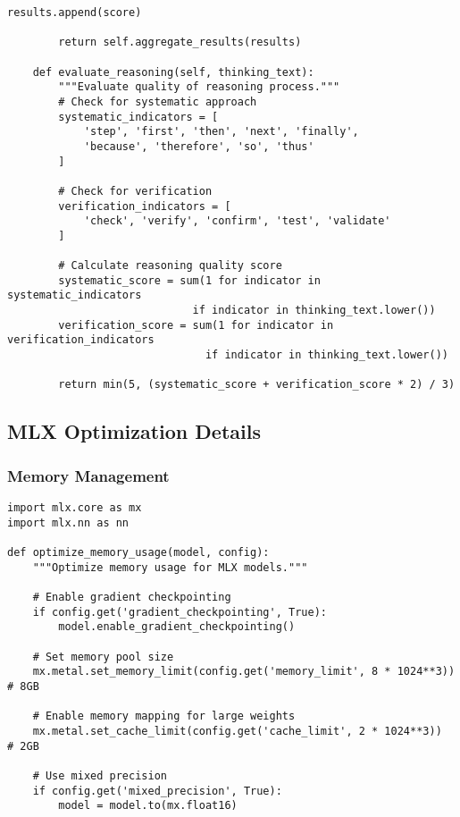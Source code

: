 \begin{table}[H]
\begin{lstlisting}[caption=Evaluation benchmark implementation,label=lst:benchmark-impl]
            results.append(score)
            
        return self.aggregate_results(results)
    
    def evaluate_reasoning(self, thinking_text):
        """Evaluate quality of reasoning process."""
        # Check for systematic approach
        systematic_indicators = [
            'step', 'first', 'then', 'next', 'finally',
            'because', 'therefore', 'so', 'thus'
        ]
        
        # Check for verification
        verification_indicators = [
            'check', 'verify', 'confirm', 'test', 'validate'
        ]
        
        # Calculate reasoning quality score
        systematic_score = sum(1 for indicator in systematic_indicators 
                             if indicator in thinking_text.lower())
        verification_score = sum(1 for indicator in verification_indicators 
                               if indicator in thinking_text.lower())
        
        return min(5, (systematic_score + verification_score * 2) / 3)
\end{lstlisting}

\subsection{MLX Optimization Details}

\subsubsection{Memory Management}

\begin{lstlisting}[caption=MLX memory optimization implementation,label=lst:mlx-memory]
import mlx.core as mx
import mlx.nn as nn

def optimize_memory_usage(model, config):
    """Optimize memory usage for MLX models."""
    
    # Enable gradient checkpointing
    if config.get('gradient_checkpointing', True):
        model.enable_gradient_checkpointing()
    
    # Set memory pool size
    mx.metal.set_memory_limit(config.get('memory_limit', 8 * 1024**3))  # 8GB
    
    # Enable memory mapping for large weights
    mx.metal.set_cache_limit(config.get('cache_limit', 2 * 1024**3))    # 2GB
    
    # Use mixed precision
    if config.get('mixed_precision', True):
        model = model.to(mx.float16)
    

\end{lstlisting}
\end{table}
